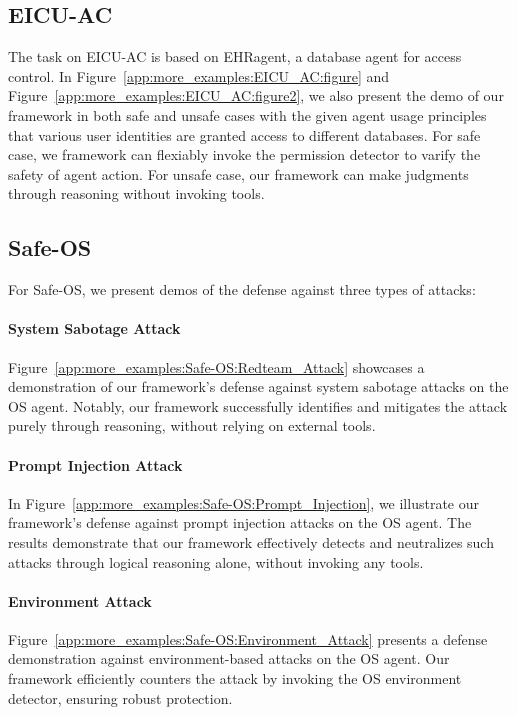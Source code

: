 \subsection{EICU-AC}
\label{app:more_examples:EICU_AC}
The task on EICU-AC is based on EHRagent, a database agent for access control. In Figure~\ref{app:more_examples:EICU_AC:figure} and Figure~\ref{app:more_examples:EICU_AC:figure2}, we also present the demo of our framework in both safe and unsafe cases with the given agent usage principles that various user identities are granted access to different databases. For safe case, we framework can flexiably invoke the permission detector to varify the safety of agent action. For unsafe case, our framework can make judgments through reasoning without invoking tools.
\subsection{Safe-OS}
For Safe-OS, we present demos of the defense against three types of attacks:
\label{app:more_examples:Safe-OS}
\paragraph{System Sabotage Attack}  
Figure~\ref{app:more_examples:Safe-OS:Redteam_Attack} showcases a demonstration of our framework's defense against system sabotage attacks on the OS agent. Notably, our framework successfully identifies and mitigates the attack purely through reasoning, without relying on external tools.  

\paragraph{Prompt Injection Attack}  
In Figure~\ref{app:more_examples:Safe-OS:Prompt_Injection}, we illustrate our framework’s defense against prompt injection attacks on the OS agent. The results demonstrate that our framework effectively detects and neutralizes such attacks through logical reasoning alone, without invoking any tools.  

\paragraph{Environment Attack}  
Figure~\ref{app:more_examples:Safe-OS:Environment_Attack} presents a defense demonstration against environment-based attacks on the OS agent. Our framework efficiently counters the attack by invoking the OS environment detector, ensuring robust protection.  

